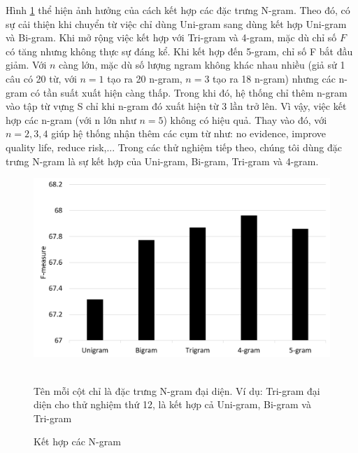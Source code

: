 Hình \ref{fig:ket-hop-ngram} thể hiện ảnh hưởng của cách kết hợp các đặc trưng N-gram. Theo đó, có sự cải thiện khi chuyển từ việc chỉ dùng Uni-gram sang dùng kết hợp Uni-gram và Bi-gram. Khi mở rộng việc kết hợp với Tri-gram và 4-gram, mặc dù chỉ số $F$ có tăng nhưng không thực sự đáng kể. Khi kết hợp đến 5-gram, chỉ số F bắt đầu giảm. Với $n$ càng lớn, mặc dù số lượng ngram không khác nhau nhiều (giả sử 1 câu có 20 từ, với $n=1$ tạo ra 20 n-gram, $n=3$ tạo ra 18 n-gram) nhưng các n-gram có tần suất xuất hiện càng thấp. Trong khi đó, hệ thống chỉ thêm n-gram vào tập từ vựng S chỉ khi n-gram đó xuất hiện từ 3 lần trở lên. Vì vậy, việc kết hợp các n-gram (với n lớn như $n=5$) không có hiệu quả. Thay vào đó, với $n=2, 3, 4$ giúp hệ thống nhận thêm các cụm từ như: no evidence, improve quality life, reduce risk,... Trong các thử nghiệm tiếp theo, chúng tôi dùng đặc trưng N-gram là sự kết hợp của Uni-gram, Bi-gram, Tri-gram và 4-gram.
\begin{figure}[H]
\centering
\begin{minipage}{1\textwidth}
\centering
\includegraphics[scale=0.35]{../hinh/ket_hop_ngram.png}
{\footnotesize \\
Tên mỗi cột chỉ là đặc trưng N-gram đại diện. Ví dụ: Tri-gram đại diện cho thử nghiệm thứ 12, là kết hợp cả Uni-gram, Bi-gram và Tri-gram \par}
\caption{Kết hợp các N-gram} \label{fig:ket-hop-ngram}
\end{minipage}
\end{figure}


